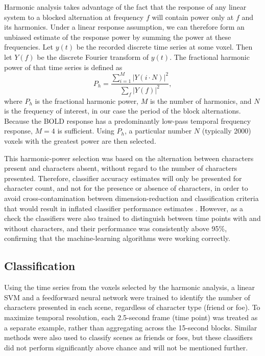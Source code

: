 \documentclass[preprint,5p,authoryear]{elsarticle}
\begin{document}
Harmonic analysis takes advantage of the fact that the response of any linear system to a blocked alternation at frequency $f$ will contain power only at $f$ and its harmonics. 
Under a linear response assumption, we can therefore form an unbiased estimate of the response power by summing the power at these frequencies. 
Let $y(t)$ be the recorded discrete time series at some voxel.
Then let $Y(f)$ be the discrete Fourier transform of $y(t)$.
The fractional harmonic power of that time series is defined as
\begin{equation}
P_h = \frac{\sum_{i = 1}^{M}{\left|Y(i \cdot N)\right|^{2}}}{\sum_{f}{\left|Y(f)\right|^{2}}},
\end{equation}
where $P_h$ is the fractional harmonic power, $M$ is the number of harmonics, and $N$ is the frequency of interest, in our case the period of the block alternations. 
Because the BOLD response has a predominantly low-pass temporal frequency response, $M = 4$ is sufficient. 
Using $P_h$, a particular number $N$ (typically 2000) voxels with the greatest power are then selected. 

This harmonic-power selection was based on the alternation between characters present and characters absent, without regard to the number of characters presented. 
Therefore, classifier accuracy estimates will only be presented for character count, and not for the presence or absence of characters, in order to avoid cross-contamination between dimension-reduction and  classification criteria that would result in inflated classifier performance estimates \citep{Pereira2009}.
However, as a check the classifiers were also trained to distinguish between time points with and without characters, and their performance was consistently above 95\%, confirming that the machine-learning algorithms were working correctly.

\subsection{Classification}
Using the time series from the voxels selected by the harmonic analysis, a linear SVM \citep{Cortes1995} and a feedforward neural network \citep{Hornik1989,Hagan1994} were trained to identify the number of characters presented in each scene, regardless of character type (friend or foe).
To maximize temporal resolution, each 2.5-second frame (time point) was treated as a separate example, rather than aggregating across the 15-second blocks.
Similar methods were also used to classify scenes as friends or foes, but these classifiers did not perform significantly above chance and will not be mentioned further.
\end{document}
